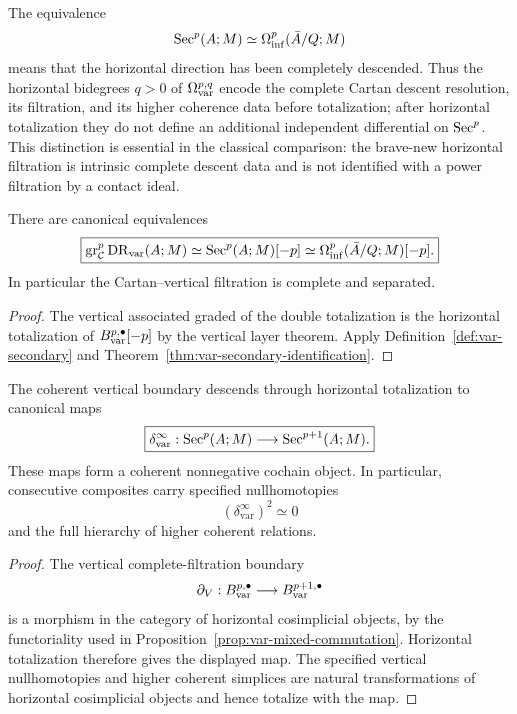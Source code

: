 \begin{remark}
\label{rem:var-horizontal-descent-resolution}
The equivalence
\[
    \operatorname{Sec}^p(A;M)
    \simeq
    \Omega_{\mathrm{inf}}^p(\bar A/Q;M)
\]
means that the horizontal direction has been completely descended. Thus the horizontal bidegrees \(q>0\) of \(\Omega_{\mathrm{var}}^{p,q}\) encode the complete Cartan descent resolution, its filtration, and its higher coherence data before totalization; after horizontal totalization they do not define an additional independent differential on \(\operatorname{Sec}^p\). This distinction is essential in the classical comparison: the brave-new horizontal filtration is intrinsic complete descent data and is not identified with a power filtration by a contact ideal.
\end{remark}

\begin{corollary}
\label{cor:var-contact-graded}
There are canonical equivalences
\[
    \boxed{
    \operatorname{gr}_{\mathcal C}^p\mathrm{DR}_{\mathrm{var}}(A;M)
    \simeq
    \operatorname{Sec}^p(A;M)[-p]
    \simeq
    \Omega_{\mathrm{inf}}^p(\bar A/Q;M)[-p].
    }
\]
In particular the Cartan--vertical filtration is complete and separated.
\end{corollary}

\begin{proof}
The vertical associated graded of the double totalization is the horizontal totalization of \(B_{\mathrm{var}}^{p,\bullet}[-p]\) by the vertical layer theorem. Apply Definition~\ref{def:var-secondary} and Theorem~\ref{thm:var-secondary-identification}.
\end{proof}

\begin{theorem}
\label{thm:var-operator}
The coherent vertical boundary descends through horizontal totalization to canonical maps
\[
    \boxed{
    \delta^{\infty}_{\mathrm{var}}:
    \operatorname{Sec}^p(A;M)
    \longrightarrow
    \operatorname{Sec}^{p+1}(A;M).
    }
\]
These maps form a coherent nonnegative cochain object. In particular, consecutive composites carry specified nullhomotopies
\[
    (\delta^{\infty}_{\mathrm{var}})^2\simeq0
\]
and the full hierarchy of higher coherent relations.
\end{theorem}

\begin{proof}
The vertical complete-filtration boundary
\[
    \partial_V:B_{\mathrm{var}}^{p,\bullet}\longrightarrow B_{\mathrm{var}}^{p+1,\bullet}
\]
is a morphism in the category of horizontal cosimplicial objects, by the functoriality used in Proposition~\ref{prop:var-mixed-commutation}. Horizontal totalization therefore gives the displayed map. The specified vertical nullhomotopies and higher coherent simplices are natural transformations of horizontal cosimplicial objects and hence totalize with the map.
\end{proof}


